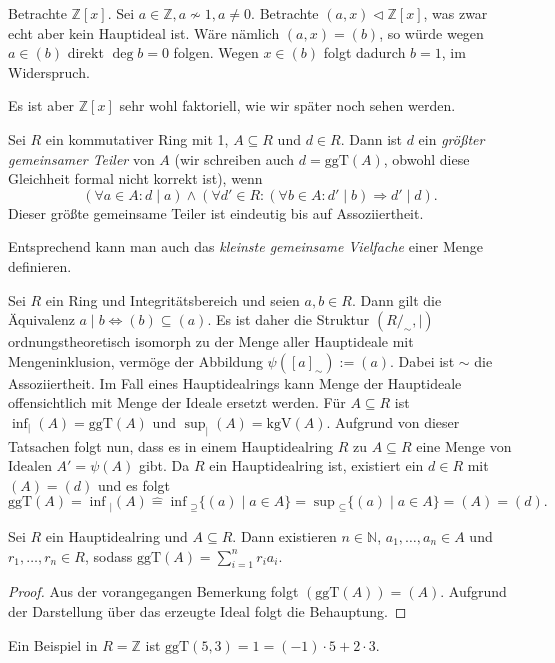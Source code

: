 \begin{example}
    Betrachte $\mathbb{Z}[x]$. Sei $a \in \mathbb{Z}, a \not\sim 1, a \neq 0$. Betrachte $({a,x}) \vartriangleleft \mathbb{Z}[x]$, was zwar echt aber kein Hauptideal ist. Wäre nämlich $({a,x}) = (b)$, so würde wegen $a \in (b)$ direkt $\deg b = 0$ folgen. Wegen $x \in (b)$ folgt dadurch $b = 1$, im Widerspruch.

    Es ist aber $\mathbb{Z}[x]$ sehr wohl faktoriell, wie wir später noch sehen werden.
\end{example}

\begin{definition}
    Sei $R$ ein kommutativer Ring mit 1, $A \subseteq R$ und $d \in R$. Dann ist $d$ ein \emph{größter gemeinsamer Teiler} von $A$ (wir schreiben auch $d = \mathrm{ggT}(A)$, obwohl diese Gleichheit formal nicht korrekt ist), wenn
    $$ (\forall a \in A: d \mid a ) \land ( \forall d' \in R : ( \forall b \in A: d' \mid b ) \Rightarrow d' \mid d  ). $$
    Dieser größte gemeinsame Teiler ist eindeutig bis auf Assoziiertheit.

    Entsprechend kann man auch das \emph{kleinste gemeinsame Vielfache} einer Menge definieren.
\end{definition}


\begin{remark}
    Sei $R$ ein Ring und Integritätsbereich und seien $a,b\in R$. Dann gilt die Äquivalenz
    $a\mid b\Leftrightarrow (b)\subseteq (a)$. Es ist daher die Struktur
    $(R/_\sim,\mid)$ ordnungstheoretisch isomorph zu der Menge aller Hauptideale mit Mengeninklusion,
    vermöge der Abbildung $\psi([a]_\sim):= (a)$. Dabei ist $\sim$ die Assoziiertheit. Im Fall eines
    Hauptidealrings kann \glqq Menge der Hauptideale\grqq{} offensichtlich mit \glqq Menge der Ideale\grqq{}
    ersetzt werden. Für $A\subseteq R$ ist $\inf_{\vert}(A)=\mathrm{ggT}(A)$ und $\sup_{\vert}(A)=\mathrm{kgV}(A)$.
    Aufgrund von dieser Tatsachen folgt nun, dass es in einem Hauptidealring $R$
    zu $A\subseteq R$ eine Menge von Idealen $A'=\psi(A)$ gibt. Da $R$ ein Hauptidealring ist,
    existiert ein $d\in R$ mit $(A)=(d)$ und es folgt
    $$\mathrm{ggT}(A)=\inf{}_|(A)\widehat{=}\inf{}_{\supseteq}\{(a)\mid a\in A\}=\sup{}_\subseteq\{(a)\mid a\in A\}=(A)=(d).$$
\end{remark}

\begin{lemma}
    Sei $R$ ein Hauptidealring und $A\subseteq R$. Dann existieren
    $n\in\mathbb{N}$, $a_1,\ldots,a_n\in A$ und $r_1,\ldots,r_n\in R$, sodass $\mathrm{ggT}(A)=\sum_{i=1}^nr_ia_i$.
\end{lemma}

\begin{proof}
    Aus der vorangegangen Bemerkung folgt $(\textrm{ggT}(A))=(A)$. Aufgrund der Darstellung über das erzeugte Ideal folgt die Behauptung.
\end{proof}

\begin{example}
    Ein Beispiel in $R=\mathbb{Z}$ ist $\textrm{ggT}(5,3)=1=(-1)\cdot 5+2\cdot 3$.
\end{example}